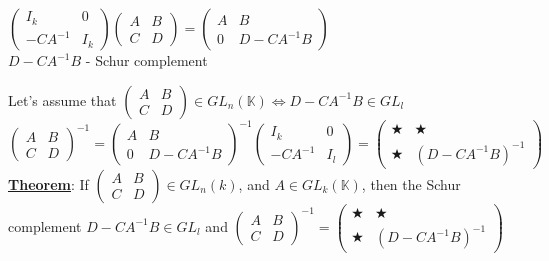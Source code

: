 \documentclass{article}
\begin{document}
    $\begin{pmatrix}
        I_k & 0 \\
        -CA^{-1} & I_k
    \end{pmatrix}
    \begin{pmatrix}
        A & B \\
        C & D
    \end{pmatrix} = 
    \begin{pmatrix}
        A & B \\
        0 & D-CA^{-1}B
    \end{pmatrix}$\\

    $D-CA^{-1}B$ - Schur complement

    Let's assume that $\begin{pmatrix}
        A & B \\
        C & D
    \end{pmatrix}\in GL_n(\mathbb{K}) \Leftrightarrow D-CA^{-1}B\in GL_l$ \\

    $\begin{pmatrix}
        A & B \\
        C & D
    \end{pmatrix}^{-1} = 
    \begin{pmatrix}
        A & B \\
        0 & D-CA^{-1}B
    \end{pmatrix}^{-1}
    \begin{pmatrix}
        I_k & 0 \\
        -CA^{-1} & I_l
    \end{pmatrix} =
    \begin{pmatrix}
        \bigstar & \bigstar \\
        \bigstar & (D-CA^{-1}B)^{-1}
    \end{pmatrix}$\\


    \underline{\textbf{Theorem}}:
    If $\begin{pmatrix}
        A & B \\
        C & D
    \end{pmatrix}\in GL_n(k)$, and $A\in GL_k (\mathbb{K})$, then the Schur complement $D-CA^{-1}B\in GL_l$ and 
    $\begin{pmatrix}
        A & B \\
        C & D
    \end{pmatrix}^{-1} =
    \begin{pmatrix}
        \bigstar & \bigstar \\
        \bigstar & (D-CA^{-1}B)^{-1}
    \end{pmatrix}$
\end{document}
